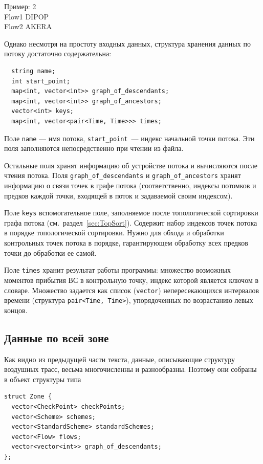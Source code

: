 \documentclass[12pt]{article}
\theoremstyle{plain}
\begin{document}
Пример:
2\\
Flow1 DIPOP\\
Flow2 AKERA

\medskip

Однако несмотря на простоту входных данных, структура хранения данных по потоку достаточно содержательна:
\begin{verbatim}
  string name;
  int start_point;
  map<int, vector<int>> graph_of_descendants;
  map<int, vector<int>> graph_of_ancestors;
  vector<int> keys;
  map<int, vector<pair<Time, Time>>> times;
\end{verbatim}
Поле \texttt{name} --- имя потока, \texttt{start\_point}~--- индекс начальной точки потока. Эти поля заполняются непосредственно при чтении из файла.

Остальные поля хранят информацию об устройстве потока и вычисляются после чтения потока. Поля \texttt{graph\_of\_descendants} и \texttt{graph\_of\_ancestors} хранят информацию о связи точек в графе потока (соответственно, индексы потомков и предков каждой точки, входящей в поток и задаваемой своим индексом). 

Поле \texttt{keys} вспомогательное поле, заполняемое после топологической сортировки графа потока (см.~раздел~\ref{sec:TopSort}). Содержит набор индексов точек потока в порядке топологической сортировки. Нужно для обхода и обработки контрольных точек потока в порядке, гарантирующем обработку всех предков точки до обработки ее самой.

Поле \texttt{times} хранит результат работы программы: множество возможных моментов прибытия ВС в контрольную точку, индекс которой является ключом в словаре. Множество задается как список (\texttt{vector}) непересекающихся интервалов времени (структура \texttt{pair<Time, Time>}), упорядоченных по возрастанию левых концов.


\subsection{Данные по всей зоне}

Как видно из предыдущей части текста, данные, описывающие структуру воздушных трасс, весьма многочисленны и разнообразны. Поэтому они собраны в объект структуры типа
\begin{verbatim}
struct Zone {
  vector<CheckPoint> checkPoints;
  vector<Scheme> schemes;
  vector<StandardScheme> standardSchemes;
  vector<Flow> flows;
  vector<vector<int>> graph_of_descendants;
};
\end{verbatim}
\end{document}
